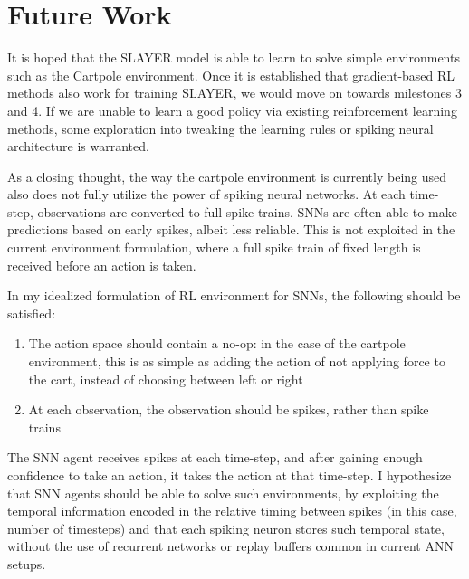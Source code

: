 \documentclass[fyp]{socreport}
\begin{document}
\section{Future Work}

It is hoped that the SLAYER model is able to learn to solve simple environments
such as the Cartpole environment. Once it is established that gradient-based RL
methods also work for training SLAYER, we would move on towards milestones 3 and
4. If we are unable to learn a good policy via existing reinforcement learning
methods, some exploration into tweaking the learning rules or spiking neural
architecture is warranted.

As a closing thought, the way the cartpole environment is currently being used
also does not fully utilize the power of spiking neural networks. At each
time-step, observations are converted to full spike trains. SNNs are often able
to make predictions based on early spikes, albeit less reliable. This is not
exploited in the current environment formulation, where a full spike train of
fixed length is received before an action is taken.

In my idealized formulation of RL environment for SNNs, the following should be
satisfied:

\begin{enumerate}
  \item The action space should contain a no-op: in the case of the cartpole
  environment, this is as simple as adding the action of not applying force to
  the cart, instead of choosing between left or right
\item At each observation, the observation should be spikes, rather than spike
trains
\end{enumerate}

The SNN agent receives spikes at each time-step, and after gaining enough
confidence to take an action, it takes the action at that time-step. I
hypothesize that SNN agents should be able to solve such environments, by
exploiting the temporal information encoded in the relative timing between
spikes (in this case, number of timesteps) and that each spiking neuron stores
such temporal state, without the use of recurrent networks or replay buffers
common in current ANN setups.

\printbibliography

\appendix
\end{document}
